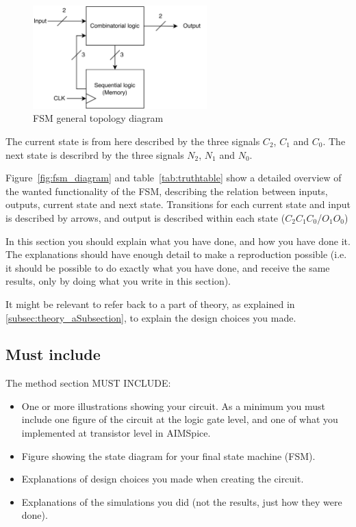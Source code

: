 \begin{figure}[H]
    \centering
    \includegraphics[width=0.6\textwidth]{Figures/FSM_overordnet.drawio.png}
    \caption{FSM general topology diagram}
    \label{fig:fsm_overordnet}
\end{figure}

The current state is from here described by the three signals $C_2$, $C_1$ and $C_0$. The next state is describrd by the three signals $N_2$, $N_1$ and $N_0$.

Figure~\ref{fig:fsm_diagram} and table~\ref{tab:truthtable} show a detailed overview of the wanted functionality of the FSM, describing the relation between inputs, outputs, current state and next state. Transitions for each current state and input is described by arrows, and output is described within each state ($C_2 C_1 C_0$/$O_1 O_0$)

In this section you should explain what you have done, and how you have done it. The explanations should have enough detail to make a reproduction possible (i.e. it should be possible to do exactly what you have done, and receive the same results, only by doing what you write in this section).


It might be relevant to refer back to a part of theory, as explained in \autoref{subsec:theory_aSubsection}, to explain the design choices you made.

\subsection{Must include}
The method section MUST INCLUDE:
\begin{itemize}
    \item One or more illustrations showing your circuit. As a minimum you must include one figure of the circuit at the logic gate level, and one of what you implemented at transistor level in AIMSpice.
    \item Figure showing the state diagram for your final state machine (FSM).
    \item Explanations of design choices you made when creating the circuit.
    \item Explanations of the simulations you did (not the results, just how they were done).
\end{itemize}